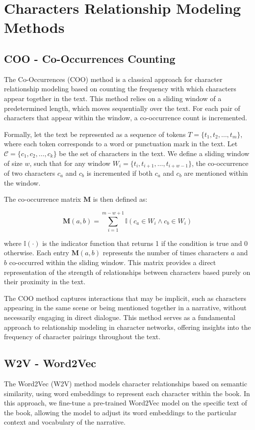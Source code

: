 \documentclass[a4paper,12pt]{report}
\begin{document}
\section{Characters Relationship Modeling Methods}
\subsection{COO - Co-Occurrences Counting}
\label{COO}
The Co-Occurrences (COO) method is a classical approach for character relationship modeling based on counting the frequency with which characters appear together in the text. This method relies on a sliding window of a predetermined length, which moves sequentially over the text. For each pair of characters that appear within the window, a co-occurrence count is incremented. 

Formally, let the text be represented as a sequence of tokens $T = \{t_1, t_2, \dots, t_m\}$, where each token corresponds to a word or punctuation mark in the text. Let $\mathcal{C} = \{c_1, c_2, \dots, c_k\}$ be the set of characters in the text. We define a sliding window of size $w$, such that for any window $W_i = \{t_i, t_{i+1}, \dots, t_{i+w-1}\}$, the co-occurrence of two characters $c_a$ and $c_b$ is incremented if both $c_a$ and $c_b$ are mentioned within the window.

The co-occurrence matrix $\mathbf{M}$ is then defined as:

\[
\mathbf{M}(a, b) = \sum_{i=1}^{m-w+1} \mathbb{I}(c_a \in W_i \land c_b \in W_i)
\]

where $\mathbb{I}(\cdot)$ is the indicator function that returns 1 if the condition is true and 0 otherwise. Each entry $\mathbf{M}(a, b)$ represents the number of times characters $a$ and $b$ co-occurred within the sliding window. This matrix provides a direct representation of the strength of relationships between characters based purely on their proximity in the text. 

The COO method captures interactions that may be implicit, such as characters appearing in the same scene or being mentioned together in a narrative, without necessarily engaging in direct dialogue. This method serves as a fundamental approach to relationship modeling in character networks, offering insights into the frequency of character pairings throughout the text.

\subsection{W2V - Word2Vec}
\label{W2V}
The Word2Vec (W2V) method models character relationships based on semantic similarity, using word embeddings to represent each character within the book. In this approach, we fine-tune a pre-trained Word2Vec model on the specific text of the book, allowing the model to adjust its word embeddings to the particular context and vocabulary of the narrative.
\end{document}
